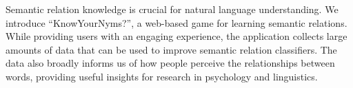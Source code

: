 Semantic relation knowledge is crucial for natural language understanding. We introduce ``KnowYourNyms?'', a web-based game for learning semantic relations. While providing users with an engaging experience, the application collects large amounts of data that can be used to improve semantic relation classifiers. The data also broadly informs us of how people perceive the relationships between words, providing useful insights for research in psychology and linguistics.
